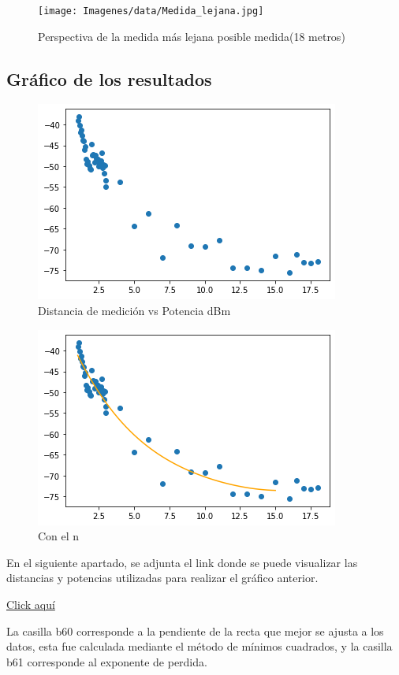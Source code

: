   \begin{figure}[H]
        \centering
        \texttt{[image: Imagenes/data/Medida\_lejana.jpg]}
        \caption{Perspectiva de la medida más lejana posible medida(18 metros)}
        \label{18m}
  \end{figure}

\subsection{Gráfico de los resultados}

  \begin{figure}[H]
        \centering
        \includegraphics[width=\linewidth]{Imagenes/grafico.png}
        \caption{Distancia de medición vs Potencia dBm}
        \label{fig:grafico}
  \end{figure}
  \begin{figure}[H]
        \centering
        \includegraphics[width=\linewidth]{Imagenes/grafico con n.png}
        \caption{Con el n}
        \label{fig:grafico}
  \end{figure}
  
En el siguiente apartado, se adjunta el link donde se puede visualizar las distancias y potencias utilizadas para realizar el gráfico anterior.

\href{https://docs.google.com/spreadsheets/d/1fRkynR8ZBY9CO_3KUc9rnQAkz-86-G7ja93jMy49Xnk/edit?usp=sharing}{Click aquí}


La casilla b60 corresponde a la pendiente de la recta que mejor se ajusta a los datos, esta fue calculada mediante el método de mínimos cuadrados, y la casilla b61 corresponde al exponente de perdida. 